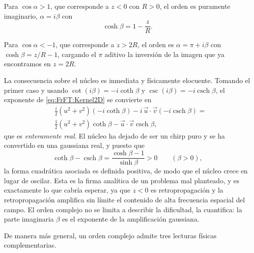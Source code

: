 			Para $\cos\alpha > 1$, que corresponde a $z<0$ con $R>0$, el orden es puramente imaginario, $\alpha = i\beta$ con
			\begin{equation}\label{eq:FrFT:ImagOrder}
				\cosh\beta = 1 - \frac{z}{R}.
			\end{equation}

			Para $\cos\alpha < -1$, que corresponde a $z>2R$, el orden es $\alpha = \pi + i\beta$ con $\cosh\beta = z/R - 1$, cargando el $\pi$ aditivo la inversión de la imagen que ya encontramos en $z=2R$.

			La consecuencia sobre el núcleo es inmediata y físicamente elocuente. Tomando el primer caso y usando $\cot(i\beta) = -i\coth\beta$ y $\csc(i\beta) = -i\operatorname{csch}\beta$, el exponente de \eqref{eq:FrFT:Kernel2D} se convierte en
			\begin{align*}
				& \frac{i}{2}\left(u^{2}+v^{2}\right)\left(-i\coth\beta\right) - i\,\vec{u}\cdot\vec{v}\left(-i\operatorname{csch}\beta\right) = \\
				& \frac{1}{2}\left(u^{2}+v^{2}\right)\coth\beta - \vec{u}\cdot\vec{v}\operatorname{csch}\beta,
			\end{align*}
			que es \textit{enteramente real}. El núcleo ha dejado de ser un chirp puro y se ha convertido en una gaussiana real, y puesto que
			\begin{equation*}
				\coth\beta - \operatorname{csch}\beta = \frac{\cosh\beta - 1}{\sinh\beta} > 0 \qquad (\beta>0),
			\end{equation*}
			la forma cuadrática asociada es definida positiva, de modo que el núcleo crece en lugar de oscilar. Esta es la firma analítica de un problema mal planteado, y es exactamente lo que cabría esperar, ya que $z<0$ es retropropagación y la retropropagación amplifica sin límite el contenido de alta frecuencia espacial del campo. El orden complejo no se limita a describir la dificultad, la cuantifica: la parte imaginaria $\beta$ es el exponente de la amplificación gaussiana.

			De manera más general, un orden complejo admite tres lecturas físicas complementarias.

